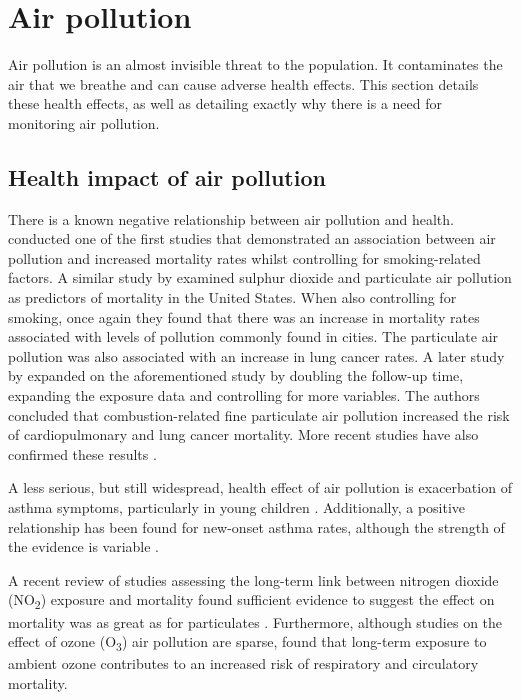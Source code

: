 \documentclass[11pt,twosided,a4paper]{report}
\begin{document}
\section{Air pollution}

Air pollution is an almost invisible threat to the population. It contaminates the air that we breathe and can cause adverse health effects. This section details these health effects, as well as detailing exactly why there is a need for monitoring air pollution.

\subsection{Health impact of air pollution} \label{healthimpact}

There is a known negative relationship between air pollution and health. \cite{dockery1993_6cityairpoll} conducted one of the first studies that demonstrated an association between air pollution and increased mortality rates whilst controlling for smoking-related factors. A similar study by \cite{pope1995particulate} examined sulphur dioxide and particulate air pollution as predictors of mortality in the United States. When also controlling for smoking, once again they found that there was an increase in mortality rates associated with levels of pollution commonly found in cities. The particulate air pollution was also associated with an increase in lung cancer rates. A later study by \cite{pope2002lungcancercardiomortality} expanded on the aforementioned study by doubling the follow-up time, expanding the exposure data and controlling for more variables. The authors concluded that combustion-related fine particulate air pollution increased the risk of cardiopulmonary and lung cancer mortality. More recent studies have also confirmed these results \citep{Anderson2012clearingtheair,Beelen2014escapeproject}.

A less serious, but still widespread, health effect of air pollution is exacerbation of asthma symptoms, particularly in young children \citep{jerrett2008childasthma}. Additionally, a positive relationship has been found for new-onset asthma rates, although the strength of the evidence is variable \citep{guarnieri2014outdoorairpollasthma}.

A recent review of studies assessing the long-term link between nitrogen dioxide (NO\textsubscript{2}) exposure and mortality found sufficient evidence to suggest the effect on mortality was as great as for particulates \citep{Faustini2014nitrogenmortality}. Furthermore, although studies on the effect of ozone (O\textsubscript{3}) air pollution are sparse, \cite{Turner2016ozonemortality} found that long-term exposure to ambient ozone contributes to an increased risk of respiratory and circulatory mortality.
\end{document}
